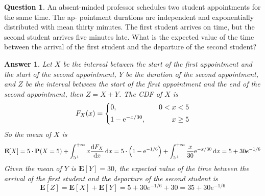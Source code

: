 \documentclass[utf8]{article}
\theoremstyle{definition}%
\newtheorem{question}{Question} %
\theoremstyle{plain}%
\newtheorem{answer}{Answer} %
\begin{document}
\begin{question}
    An absent-minded professor schedules two student appointments for the same time. The ap- pointment durations are independent and exponentially distributed with mean thirty minutes. The first student arrives on time, but the second student arrives five minutes late. What is the expected value of the time between the arrival of the first student and the departure of the second student?
\end{question}
\begin{answer}
    Let $X$ be the interval between the start of the first appointment and the start of the second appointment, $Y$ be the duration of the second appointment, and $Z$ be the interval between the start of the first appointment and the end of the second appointment, then $Z = X + Y$. The CDF of $X$ is
    \begin{equation}
        F_{X}(x) = \left\{\begin{aligned}
            &0, \quad &0 < x < 5 \\
            &1 - \mathrm{e}^{-x/30}, \quad &x \geq 5
        \end{aligned}\right.
    \end{equation}
    So the mean of $X$ is
    \begin{equation}
        \mathbf{E}[X] = 5 \cdot \mathbf{P}(X = 5) + \int_{5^+}^{+\infty} x \dv{F_{X}}{x} \dd{x} = 5 \cdot \left(1 - \mathrm{e}^{-1/6}\right) + \int_{5^+}^{+\infty} \frac{x}{30} \mathrm{e}^{-x/30} \dd{x} = 5 + 30e^{-1/6}
    \end{equation}
    Given the mean of $Y$ is $\mathbf{E}[Y] = 30$, the expected value of the time between the arrival of the first student and the departure of the second student is
    \begin{equation}
        \mathbf{E}[Z] = \mathbf{E}[X] + \mathbf{E}[Y] = 5 + 30e^{-1/6} + 30 = 35 + 30e^{-1/6}
    \end{equation}
\end{answer}
\end{document}
